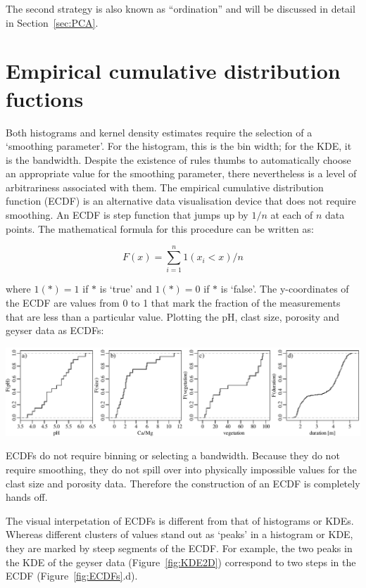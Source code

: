 The second strategy is also known as ``ordination'' and will be
discussed in detail in Section~\ref{sec:PCA}.

\section{Empirical cumulative distribution fuctions}
\label{sec:ECDF}

Both histograms and kernel density estimates require the selection of
a `smoothing parameter'. For the histogram, this is the bin width; for
the KDE, it is the bandwidth. Despite the existence of rules thumbs to
automatically choose an appropriate value for the smoothing parameter,
there nevertheless is a level of arbitrariness associated with
them. The empirical cumulative distribution function (ECDF) is an
alternative data visualisation device that does not require
smoothing. An ECDF is step function that jumps up by $1/n$ at each of
$n$ data points.  The mathematical formula for this procedure can be
written as:
  
  \begin{equation}
    F(x) = \sum\limits_{i=1}^{n} 1(x_i<x)/n
    \label{eq:ECDF}
  \end{equation}
 
\noindent where $1(\ast) = 1$ if $\ast$ is `true' and $1(\ast) = 0$ if
$\ast$ is `false'. The y-coordinates of the ECDF are values from 0 to
1 that mark the fraction of the measurements that are less than a
particular value.  Plotting the pH, clast size, porosity and geyser
data as ECDFs:

\noindent\includegraphics[width=\textwidth]{../figures/ECDFs.pdf}
\begingroup
{}
\label{fig:ECDFs}
\endgroup

ECDFs do not require binning or selecting a bandwidth.  Because they
do not require smoothing, they do not spill over into physically
impossible values for the clast size and porosity data. Therefore the
construction of an ECDF is completely hands off.\medskip

The visual interpetation of ECDFs is different from that of histograms
or KDEs. Whereas different clusters of values stand out as `peaks' in
a histogram or KDE, they are marked by steep segments of the ECDF. For
example, the two peaks in the KDE of the geyser data
(Figure~\ref{fig:KDE2D}) correspond to two steps in the ECDF
(Figure~\ref{fig:ECDFs}.d).
